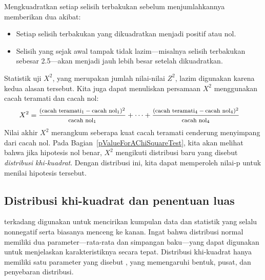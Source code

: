 Mengkuadratkan setiap selisih terbakukan sebelum menjumlahkannya memberikan dua akibat:
\begin{itemize}
\setlength{\itemsep}{0mm}
\item Setiap selisih terbakukan yang dikuadratkan menjadi positif atau nol.
\item Selisih yang sejak awal tampak tidak lazim---misalnya selisih terbakukan sebesar 2.5---akan menjadi jauh lebih besar setelah dikuadratkan.
\end{itemize}
Statistik uji $X^2$, yang merupakan jumlah nilai-nilai $Z^2$, lazim digunakan karena kedua alasan tersebut. Kita juga dapat menuliskan persamaan $X^2$ menggunakan cacah teramati dan cacah nol:
\begin{align*}
X^2 &=
	\frac
	{\text{\footnotesize$(\text{cacah teramati}_1 - \text{cacah nol}_1)^2$}}
	{\text{\footnotesize$\text{cacah nol}_1$}}
	+ \dots + \frac
	{\text{\footnotesize$(\text{cacah teramati}_4 - \text{cacah nol}_4)^2$}}
	{\text{\footnotesize$\text{cacah nol}_4$}}
\end{align*}
Nilai akhir $X^2$ merangkum seberapa kuat cacah teramati cenderung menyimpang dari cacah nol. Pada Bagian~\ref{pValueForAChiSquareTest}, kita akan melihat bahwa jika hipotesis nol benar, $X^2$ mengikuti distribusi baru yang disebut \emph{distribusi khi-kuadrat}. Dengan distribusi ini, kita dapat memperoleh nilai-p untuk menilai hipotesis tersebut.


\subsection{Distribusi khi-kuadrat dan penentuan luas}

 terkadang digunakan untuk
mencirikan kumpulan data dan statistik yang selalu nonnegatif
serta biasanya menceng ke kanan. Ingat bahwa distribusi normal memiliki
dua parameter---rata-rata dan simpangan baku---yang dapat
digunakan untuk menjelaskan karakteristiknya secara tepat.
Distribusi khi-kuadrat hanya memiliki satu parameter yang disebut
,
yang memengaruhi bentuk, pusat, dan penyebaran distribusi.

